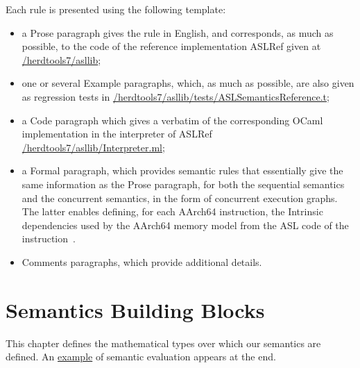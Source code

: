 \documentclass{book}
\begin{document}
Each rule is presented using the following template:
\begin{itemize}
\item a Prose paragraph gives the rule in English, and corresponds, as much as possible, to the code of the reference implementation ASLRef given at
 \href{https://github.com/herd/herdtools7//tree/master/asllib}{/herdtools7/asllib};

 \item one or several Example paragraphs, which, as much as possible, are also given as regression tests in
\href{https://github.com/herd/herdtools7//tree/master/asllib/tests/ASLSemanticsReference.t}{/herdtools7/asllib/tests/ASLSemanticsReference.t};

\ifcode
\item a Code paragraph which gives a verbatim of the corresponding OCaml implementation in the interpreter of ASLRef
\href{https://github.com/herd/herdtools7//tree/master/asllib/Interpreter.ml}{/herdtools7/asllib/Interpreter.ml};
\fi

\item a Formal paragraph, which provides semantic rules that essentially give the same information as the Prose paragraph, for both
the sequential semantics and the concurrent semantics, in the form of concurrent execution graphs.
The latter enables defining, for each AArch64 instruction,
the Intrinsic dependencies used by the AArch64 memory model from the ASL code of the instruction~\cite[B2.3.2]{ArmARM}.

\item Comments paragraphs, which provide additional details. %
\end{itemize}



\chapter{Semantics Building Blocks}
\label{chap:semanticsbuildingblocks}
This chapter defines the mathematical types over which our semantics are defined.
An \hyperlink{eval-example}{example} of semantic evaluation appears at the end.

\end{document}
